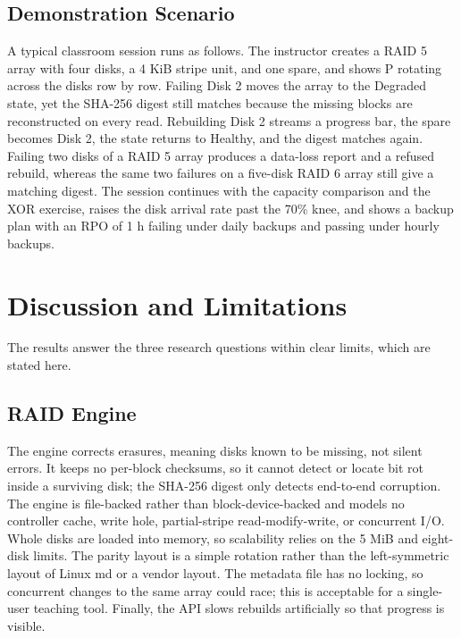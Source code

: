 \documentclass{ieeeaccess}
\begin{document}
\subsection{Demonstration Scenario}
A typical classroom session runs as follows. The instructor creates a RAID 5 array with four disks, a 4 KiB stripe unit, and one spare, and shows P rotating across the disks row by row. Failing Disk 2 moves the array to the Degraded state, yet the SHA-256 digest still matches because the missing blocks are reconstructed on every read. Rebuilding Disk 2 streams a progress bar, the spare becomes Disk 2, the state returns to Healthy, and the digest matches again. Failing two disks of a RAID 5 array produces a data-loss report and a refused rebuild, whereas the same two failures on a five-disk RAID 6 array still give a matching digest. The session continues with the capacity comparison and the XOR exercise, raises the disk arrival rate past the 70\% knee, and shows a backup plan with an RPO of 1 h failing under daily backups and passing under hourly backups.

\section{Discussion and Limitations}
\label{sec:disc}

The results answer the three research questions within clear limits, which are stated here.

\subsection{RAID Engine}
The engine corrects erasures, meaning disks known to be missing, not silent errors. It keeps no per-block checksums, so it cannot detect or locate bit rot inside a surviving disk; the SHA-256 digest only detects end-to-end corruption. The engine is file-backed rather than block-device-backed and models no controller cache, write hole, partial-stripe read-modify-write, or concurrent I/O. Whole disks are loaded into memory, so scalability relies on the 5 MiB and eight-disk limits. The parity layout is a simple rotation rather than the left-symmetric layout of Linux md or a vendor layout. The metadata file has no locking, so concurrent changes to the same array could race; this is acceptable for a single-user teaching tool. Finally, the API slows rebuilds artificially so that progress is visible.
\end{document}
